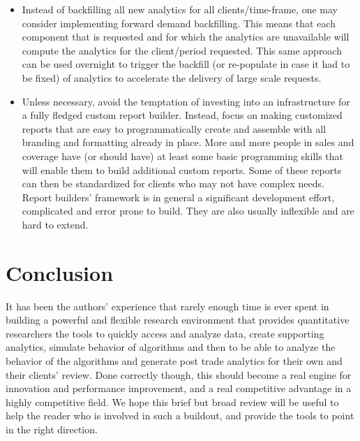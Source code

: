 \begin{itemize}
\item Instead of backfilling all new analytics for all clients/time-frame, one may consider implementing forward demand backfilling. This means that each component that is requested and for which the analytics are unavailable will compute the analytics for the client/period requested. This same approach can be used overnight to trigger the backfill  (or re-populate in case it had to be fixed) of analytics to accelerate the delivery of large scale requests.

\item Unless necessary, avoid the temptation of investing into an infrastructure for a fully fledged custom report builder. Instead, focus on making customized reports that are easy to programmatically create and assemble with all branding and formatting already in place. More and more people in sales and coverage have (or should have) at least some basic programming skills that will enable them to build additional custom reports. Some of these reports can then be standardized for clients who may not have complex needs. Report builders' framework is in general a significant development effort, complicated and error prone to build. They are also usually inflexible and are hard to extend. 
\end{itemize}

 

\section{Conclusion\label{sec:tech_concl}}

It has been the authors' experience that rarely enough time is ever spent in building a powerful and flexible research environment that provides quantitative researchers the tools to quickly access and analyze data, create supporting analytics, simulate behavior of algorithms and then to be able to analyze the behavior of the algorithms and generate post trade analytics for their own and their clients' review. Done correctly though, this should become a real engine for innovation and performance improvement, and a real competitive advantage in a highly competitive field. We hope this brief but broad review will be useful to help the reader who is involved in such a buildout, and provide the tools to point in the right direction.\label{in:exec_tech2}\label{in:research_stack2}